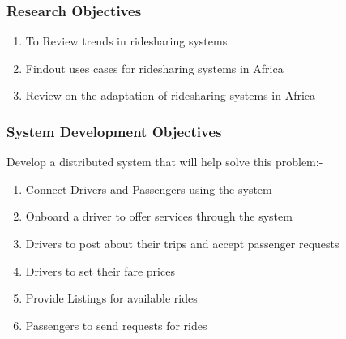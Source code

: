 \subsubsection{Research Objectives}
\begin{enumerate}
    \item To Review trends in ridesharing systems
    \item Findout uses cases for ridesharing systems in Africa
    \item Review on the adaptation of ridesharing systems in Africa
\end{enumerate}

\subsubsection{System Development Objectives}
Develop a distributed system that will help solve this problem:-

\begin{enumerate}
    \item Connect Drivers and Passengers using the system
    \item Onboard a driver to offer services through the system
    \item Drivers to post about their trips and accept passenger requests
    \item Drivers to set their fare prices
    \item Provide Listings for available rides
    \item Passengers to send requests for rides
\end{enumerate}
